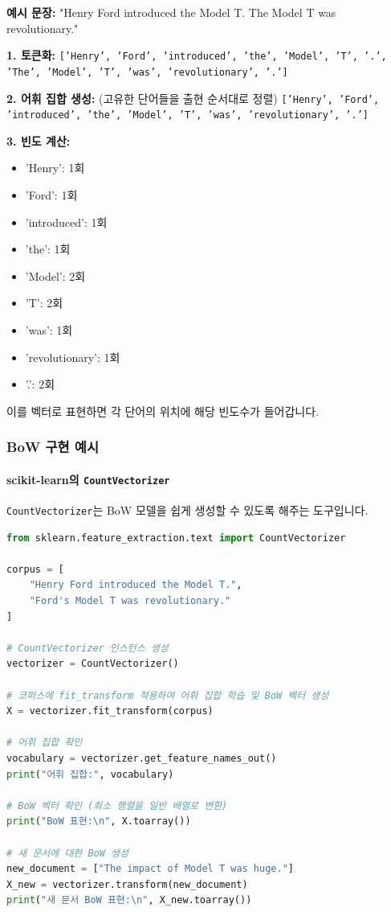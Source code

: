 \documentclass[11pt,a4paper]{article}
\begin{document}
\begin{examplebox}
\textbf{예시 문장:} "Henry Ford introduced the Model T. The Model T was revolutionary."

\textbf{1. 토큰화:}
\texttt{['Henry', 'Ford', 'introduced', 'the', 'Model', 'T', '.', 'The', 'Model', 'T', 'was', 'revolutionary', '.']}

\textbf{2. 어휘 집합 생성:} (고유한 단어들을 출현 순서대로 정렬)
\texttt{['Henry', 'Ford', 'introduced', 'the', 'Model', 'T', 'was', 'revolutionary', '.']}

\textbf{3. 빈도 계산:}
\begin{itemize}
    \item 'Henry': 1회
    \item 'Ford': 1회
    \item 'introduced': 1회
    \item 'the': 1회
    \item 'Model': 2회
    \item 'T': 2회
    \item 'was': 1회
    \item 'revolutionary': 1회
    \item '.': 2회
\end{itemize}
이를 벡터로 표현하면 각 단어의 위치에 해당 빈도수가 들어갑니다.
\end{examplebox}

\subsubsection{BoW 구현 예시}

\paragraph{scikit-learn의 \texttt{CountVectorizer}}
\texttt{CountVectorizer}는 BoW 모델을 쉽게 생성할 수 있도록 해주는 도구입니다.

\begin{lstlisting}[language=Python, caption={scikit-learn CountVectorizer를 이용한 BoW 생성}, label=lst:sklearn_bow]
from sklearn.feature_extraction.text import CountVectorizer

corpus = [
    "Henry Ford introduced the Model T.",
    "Ford's Model T was revolutionary."
]

# CountVectorizer 인스턴스 생성
vectorizer = CountVectorizer()

# 코퍼스에 fit_transform 적용하여 어휘 집합 학습 및 BoW 벡터 생성
X = vectorizer.fit_transform(corpus)

# 어휘 집합 확인
vocabulary = vectorizer.get_feature_names_out()
print("어휘 집합:", vocabulary)

# BoW 벡터 확인 (희소 행렬을 일반 배열로 변환)
print("BoW 표현:\n", X.toarray())

# 새 문서에 대한 BoW 생성
new_document = ["The impact of Model T was huge."]
X_new = vectorizer.transform(new_document)
print("새 문서 BoW 표현:\n", X_new.toarray())
\end{lstlisting}
\end{document}
